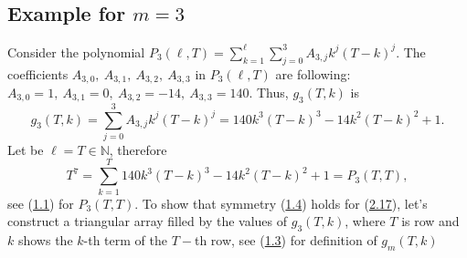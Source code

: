 \documentclass[11pt, letterpaper]{amsart}
\theoremstyle{definition}
\theoremstyle{remark}
\numberwithin{equation}{section}
\begin{document}
\subsection{Example for \texorpdfstring{$m=3$}{m=3}}
Consider the polynomial $P_3(\ell,T)=\sum_{k=1}^{\ell}\sum_{j=0}^3 A_{3,j}k^j(T-k)^j$.
The coefficients $A_{3,0}, \ A_{3,1}, \ A_{3,2}, \ A_{3,3}$ in $P_3(\ell,T)$ are following: $A_{3,0}=1, \ A_{3,1}=0, \ A_{3,2}=-14, \ A_{3,3}=140$. Thus, $g_3(T,k)$ is
\begin{equation}\label{7th_pow_generating_function}
g_3(T,k)=\sum_{j=0}^3 A_{3,j}k^j(T-k)^j=140k^3(T-k)^3-14k^2(T-k)^2+1.
\end{equation}
Let be $\ell=T\in\mathbb{N}$, therefore
\begin{equation}\label{seventh_power_identity}
T^7=\sum_{k=1}^{T} 140k^3(T-k)^3-14k^2(T-k)^2+1=P_3(T,T),
\end{equation}
see (\hyperref[f1]{1.1}) for $P_3(T,T)$. To show that symmetry (\hyperref[symmetry_2]{1.4}) holds for (\hyperref[7th_pow_generating_function]{2.17}), let's construct a triangular array filled by the values of $g_3(T,k)$, where $T$ is row and $k$ shows the $k$-th term of the $T-$th row, see (\hyperref[symmetry_1]{1.3}) for definition of $g_m(T,k)$
\end{document}
